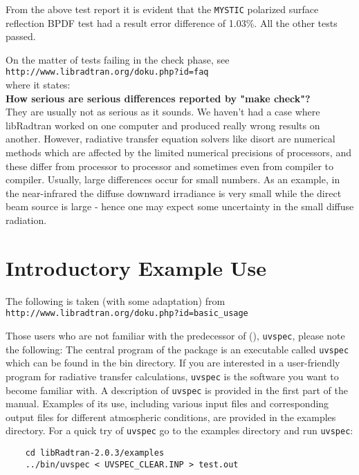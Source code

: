 \begin{enumerate}
From the above test report it is evident that the \lstinline{MYSTIC} polarized surface reflection \ac{BPDF} test had a result error difference of 1.03\%.
All the other tests passed.

On the matter of tests failing in the check phase, see\\
\lstinline{http://www.libradtran.org/doku.php?id=faq}\\
where it states:\\
\textbf{How serious are serious differences reported by "make check"?}\\
They are usually not as serious as it sounds. We haven't had a case where libRadtran worked on one computer and produced really wrong results on another. However, radiative transfer equation solvers like disort are numerical methods which are affected by the limited numerical precisions of processors, and these differ from processor to processor and sometimes even from compiler to compiler. Usually, large differences occur for small numbers. As an example, in the near-infrared the diffuse downward irradiance is very small while the direct beam source is large - hence one may expect some uncertainty in the small diffuse radiation.

\end{enumerate}

\section{Introductory Example Use}

The following is taken (with some adaptation) from \\
\lstinline{http://www.libradtran.org/doku.php?id=basic_usage}

Those users who are not familiar with the predecessor of \libradtran(), \lstinline{uvspec}, please note the following: The central program of the package is an executable called \lstinline{uvspec} which can be found in the bin directory. If you are interested in a user-friendly program for radiative transfer calculations, \lstinline{uvspec} is the software you want to become familiar with. A description of \lstinline{uvspec} is provided in the first part of the manual. Examples of its use, including various input files and corresponding output files for different atmospheric conditions, are provided in the examples directory. For a quick try of \lstinline{uvspec} go to the examples directory and run \lstinline{uvspec}:

\begin{lstlisting}
    cd libRadtran-2.0.3/examples
    ../bin/uvspec < UVSPEC_CLEAR.INP > test.out
\end{lstlisting}




